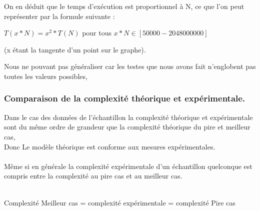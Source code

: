 \documentclass[12pt]{article}
\begin{document}
On en déduit que le temps d'exécution est proportionnel à N, ce que l'on peut représenter par la formule suivante
: 
\begin{center}
\color{red}
	$T(x*N) = x^2*T(N)$ pour tous $ x*N \in [50000 - 2048000000] $	
	
\color{black}
(x étant la tangente d'un point sur le graphe).
\end{center}

Nous ne pouvant pas généraliser car les testes que nous avons fait n'englobent pas toutes les valeurs possibles, 
	



\subsubsection{Comparaison de la complexité théorique et expérimentale. }
Dans le cas des données de l'échantillon la complexité théorique et expérimentale sont du même ordre de grandeur que la complexité théorique du pire et meilleur cas,\\
\color{blue}
Donc Le modèle théorique est conforme aux mesures expérimentales.
\color{black}
\\
\texttt{  }
\\
Même si en générale la complexité expérimentale d'un échantillon quelconque est compris entre la complexité au pire cas et au meilleur cas.
\\
\texttt{  }
\\
\begin{center}
\color{blue}
Complexité Meilleur cas = complexité expérimentale = complexité Pire cas 
\color{black}
\end{center}
\end{document}
